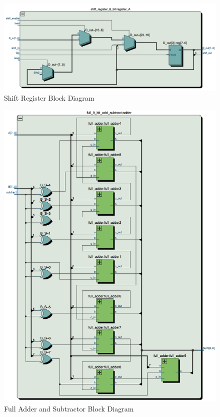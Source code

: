 \documentclass[journal, twocolumn, final,11pt,letterpaper]{IEEEtran}
\begin{document}
\begin{figure} [htbp]
	\centering
	\includegraphics[scale=0.5]{shift-register-diagram.png}
	\caption{Shift Register Block Diagram\label{fig:shift-register-diagram}}
\end{figure}

\begin{figure} [htbp]
	\centering
	\includegraphics[scale=0.5]{full-adder-subtractor-diagram.png}
	\caption{Full Adder and Subtractor Block Diagram\label{fig:full-adder-subtractor-diagram}}
\end{figure}
\end{document}
